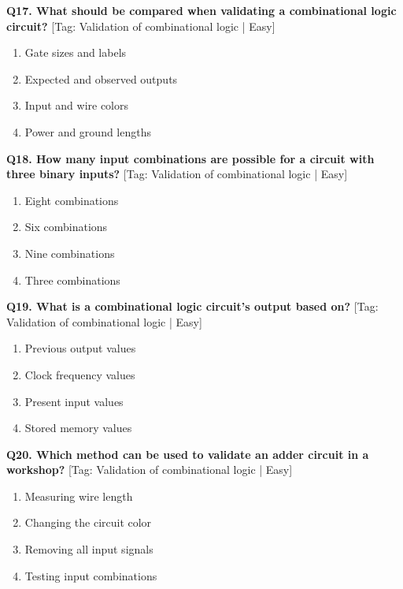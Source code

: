 \noindent\textbf{Q17. What should be compared when validating a combinational logic circuit?} \hfill [Tag: Validation of combinational logic | Easy]
\begin{enumerate}[label=(\alph*),topsep=2pt,itemsep=1pt,partopsep=0pt,parsep=0pt]
    \item {Gate sizes and labels}
    \item {Expected and observed outputs}
    \item {Input and wire colors}
    \item {Power and ground lengths}
\end{enumerate}
\vspace{2mm}

\noindent\textbf{Q18. How many input combinations are possible for a circuit with three binary inputs?} \hfill [Tag: Validation of combinational logic | Easy]
\begin{enumerate}[label=(\alph*),topsep=2pt,itemsep=1pt,partopsep=0pt,parsep=0pt]
    \item {Eight combinations}
    \item {Six combinations}
    \item {Nine combinations}
    \item {Three combinations}
\end{enumerate}
\vspace{2mm}

\noindent\textbf{Q19. What is a combinational logic circuit's output based on?} \hfill [Tag: Validation of combinational logic | Easy]
\begin{enumerate}[label=(\alph*),topsep=2pt,itemsep=1pt,partopsep=0pt,parsep=0pt]
    \item {Previous output values}
    \item {Clock frequency values}
    \item {Present input values}
    \item {Stored memory values}
\end{enumerate}
\vspace{2mm}

\noindent\textbf{Q20. Which method can be used to validate an adder circuit in a workshop?} \hfill [Tag: Validation of combinational logic | Easy]
\begin{enumerate}[label=(\alph*),topsep=2pt,itemsep=1pt,partopsep=0pt,parsep=0pt]
    \item {Measuring wire length}
    \item {Changing the circuit color}
    \item {Removing all input signals}
    \item {Testing input combinations}
\end{enumerate}
\vspace{2mm}

